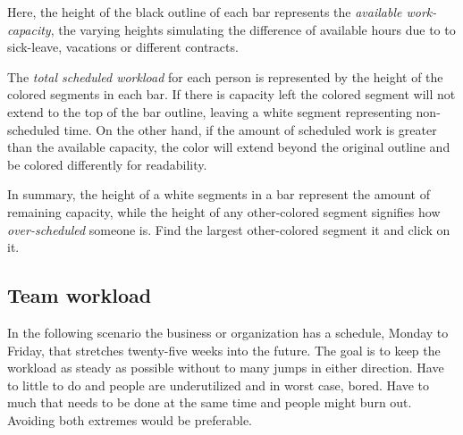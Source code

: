 {    Here, the height of the black outline of each bar represents the
    \textit{available work-capacity}, the varying heights simulating the
    difference of available hours due to to sick-leave, vacations or
    different contracts.

    The \textit{total scheduled workload} for
    each person is represented by the height of the colored segments in
    each bar. If there is capacity left the colored segment will not extend to the
    top of the bar outline, leaving a white segment representing
    non-scheduled time. On the other hand, if the amount of scheduled work
    is greater than the available capacity, the color will extend beyond
    the original outline and be colored differently for readability.

    In summary, the height of a white segments in a bar represent the
    amount of remaining capacity, while the height of any other-colored
    segment signifies how \textit{over-scheduled} someone is. Find the
    largest other-colored segment it and click on it.

  \subsection{Team workload}

    \textit{\ideaTwo}

    In the following scenario the business or organization has a schedule,
    Monday to Friday, that stretches twenty-five weeks into the future. The
    goal is to keep the workload as steady as possible without to many
    jumps in either direction. Have to little to do and people are
    underutilized and in worst case, bored. Have to much that needs to be
    done at the same time and people might burn out. Avoiding both
    extremes would be preferable.

}
